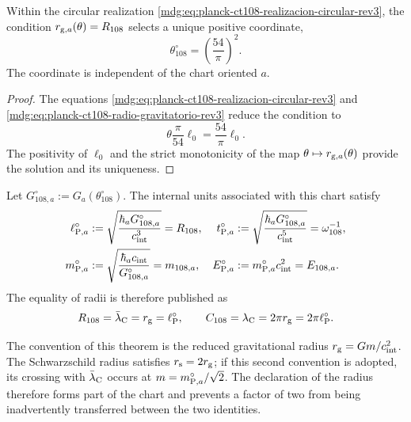 \begin{proposition}
\label{mdg:prop:selector-circular-planck-ct108-rev3}
Within the circular realization
\eqref{mdg:eq:planck-ct108-realizacion-circular-rev3}, the condition
\(r_{{\rm g},a}(\theta)=R_{108}\) selects a unique positive coordinate,
\begin{equation}
 \boxed{\theta_{108}^{\circ}=\left(\frac{54}{\pi}\right)^2.}
 \label{mdg:eq:theta-circular-planck-ct108-rev3}
\end{equation}
The coordinate is independent of the chart oriented \(a\).
\end{proposition}

\begin{proof}
The equations
\eqref{mdg:eq:planck-ct108-realizacion-circular-rev3} and
\eqref{mdg:eq:planck-ct108-radio-gravitatorio-rev3} reduce the condition to
\[
 \theta\frac{\pi}{54}\ell_0=\frac{54}{\pi}\ell_0.
\]
The positivity of \(\ell_0\) and the strict monotonicity of the map
\(\theta\mapsto r_{{\rm g},a}(\theta)\) provide the solution and its
uniqueness.
\end{proof}

Let \(G_{108,a}^{\circ}:=G_a(\theta_{108}^{\circ})\). The internal units
associated with this chart satisfy
\begin{align}
 \ell_{{\rm P},a}^{\circ}
 &:=\sqrt{\frac{\hbar_a G_{108,a}^{\circ}}{c_{\rm int}^{3}}}
 =R_{108},
 &
 t_{{\rm P},a}^{\circ}
 &:=\sqrt{\frac{\hbar_a G_{108,a}^{\circ}}{c_{\rm int}^{5}}}
 =\omega_{108}^{-1},
 \label{mdg:eq:planck-ct108-longitud-tiempo-rev3}\\
 m_{{\rm P},a}^{\circ}
 &:=\sqrt{\frac{\hbar_a c_{\rm int}}{G_{108,a}^{\circ}}}
 =m_{108,a},
 &
 E_{{\rm P},a}^{\circ}
 &:=m_{{\rm P},a}^{\circ}c_{\rm int}^{2}=E_{108,a}.
 \label{mdg:eq:planck-ct108-masa-energia-rev3}
\end{align}
The equality of radii is therefore published as
\begin{equation}
 R_{108}=\bar\lambda_{\rm C}=r_{\rm g}=\ell_{\rm P}^{\circ},
 \qquad
 C_{108}=\lambda_{\rm C}=2\pi r_{\rm g}=2\pi\ell_{\rm P}^{\circ}.
 \label{mdg:eq:planck-ct108-tres-lectores-rev3}
\end{equation}

The convention of this theorem is the reduced gravitational radius
\(r_{\rm g}=Gm/c_{\rm int}^{2}\). The Schwarzschild radius satisfies
\(r_{\rm s}=2r_{\rm g}\); if this second convention is adopted, its crossing with
\(\bar\lambda_{\rm C}\) occurs at
\(m=m_{{\rm P},a}^{\circ}/\sqrt2\). The declaration of the radius therefore forms
part of the chart and prevents a factor of two from being inadvertently transferred
between the two identities.

